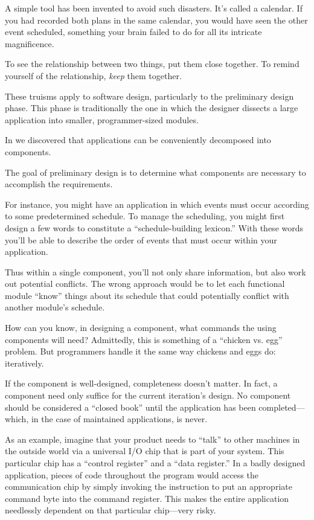 A simple tool has been invented to avoid such disasters. It's called a
calendar. If you had recorded both plans in the same calendar, you would
have seen the other event scheduled, something your brain failed to do
for all its intricate magnificence.

\begin{tip}
To see the relationship between two things, put them close
together. To remind yourself of the relationship, \emph{keep} them
together.
\end{tip}
These truisms apply to software design, particularly to the preliminary
design phase. This phase is traditionally the one in which the designer
dissects a large application into smaller, programmer-sized modules.

In  we discovered that applications can be
conveniently decomposed into components.

\begin{tip}
The goal of preliminary design is to determine what components are
necessary to accomplish the requirements.
\end{tip}
For instance, you might have an application in which events must occur
according to some predetermined schedule. To manage the scheduling,
you might first design a few words to constitute a ``schedule-building
lexicon.'' With these words you'll be able to describe the order of events
that must occur within your application.

Thus within a single component, you'll not only share information,
but also work out potential conflicts. The wrong approach would be to let
each functional module ``know'' things about its schedule that could
potentially conflict with another module's schedule.

How can you know, in designing a component, what commands the
using components will need? Admittedly, this is something of a ``chicken
vs. egg'' problem. But \Forth{} programmers handle it the same way
chickens and eggs do: iteratively.

If the component is well-designed, completeness doesn't matter. In
fact, a component need only suffice for the current iteration's design. No
component should be considered a ``closed book'' until the application
has been completed---which, in the case of maintained applications, is
never.

As an example, imagine that your product needs to ``talk'' to other
machines in the outside world via a universal I/O chip that is part of your
system. This particular chip has a ``control register'' and a ``data
register.'' In a badly designed application, pieces of code throughout the
program would access the communication chip by simply invoking the
 instruction to put an appropriate command byte into the command
register. This makes the entire application needlessly dependent on that
particular chip---very risky.

